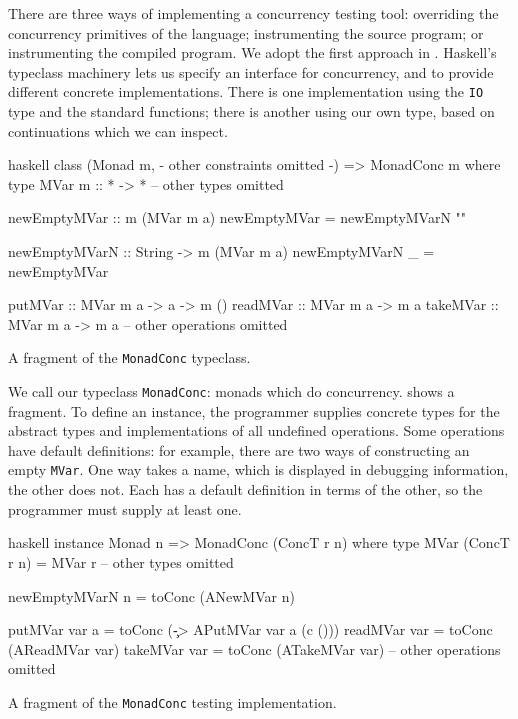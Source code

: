 There are three ways of implementing a concurrency testing tool:
overriding the concurrency primitives of the language; instrumenting
the source program; or instrumenting the compiled program.  We adopt
the first approach in \dejafu{}.  Haskell's typeclass machinery lets
us specify an interface for concurrency, and to provide different
concrete implementations.  There is one implementation using the
\verb|IO| type and the standard functions; there is another using our
own type, based on continuations which we can inspect.

\begin{listing}
\centering
\begin{cminted}{haskell}
class (Monad m, {- other constraints omitted -}) => MonadConc m where
  type MVar m :: * -> *
  -- other types omitted

  newEmptyMVar :: m (MVar m a)
  newEmptyMVar = newEmptyMVarN ""

  newEmptyMVarN :: String -> m (MVar m a)
  newEmptyMVarN _ = newEmptyMVar

  putMVar  :: MVar m a -> a -> m ()
  readMVar :: MVar m a -> m a
  takeMVar :: MVar m a -> m a
  -- other operations omitted
\end{cminted}
\caption{A fragment of the \texttt{MonadConc} typeclass.}\label{lst:monadconc}
\end{listing}

We call our typeclass \verb|MonadConc|: monads which do concurrency.
 shows a fragment.  To define an instance, the
programmer supplies concrete types for the abstract types and
implementations of all undefined operations.  Some operations have
default definitions: for example, there are two ways of constructing
an empty \verb|MVar|.  One way takes a name, which is displayed in
debugging information, the other does not.  Each has a default
definition in terms of the other, so the programmer must supply at
least one.

\begin{listing}
\centering
\begin{cminted}{haskell}
instance Monad n => MonadConc (ConcT r n) where
  type MVar (ConcT r n) = MVar r
  -- other types omitted

  newEmptyMVarN n = toConc (ANewMVar n)

  putMVar  var a = toConc (\c -> APutMVar var a (c ()))
  readMVar var   = toConc (AReadMVar var)
  takeMVar var   = toConc (ATakeMVar var)
  -- other operations omitted
\end{cminted}
\caption{A fragment of the \texttt{MonadConc} testing implementation.}\label{lst:mvarops}
\end{listing}

